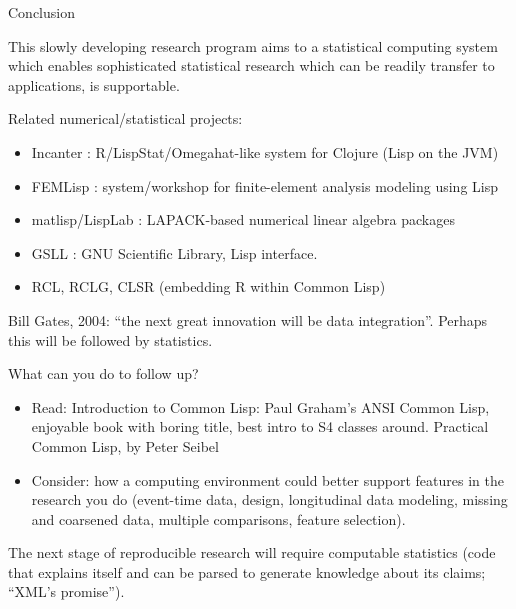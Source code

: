 \documentclass{beamer}
\begin{document}
\begin{frame}{Conclusion}

  This slowly developing research program aims to a statistical
  computing system which enables sophisticated statistical research
  which can be readily transfer to applications, is supportable.

  Related numerical/statistical projects:
  \begin{itemize}
  \item Incanter : R/LispStat/Omegahat-like system for Clojure (Lisp
    on the JVM)
  \item FEMLisp : system/workshop for finite-element analysis modeling
    using Lisp
  \item matlisp/LispLab : LAPACK-based numerical linear algebra packages
  \item GSLL : GNU Scientific Library, Lisp interface.
  \item RCL, RCLG, CLSR (embedding R within Common Lisp)
  \end{itemize}

  Bill Gates, 2004: ``the next great innovation will be data
  integration''.  Perhaps this will be followed by statistics.
\end{frame}

\begin{frame}{What can you do to follow up?}

  \begin{itemize}
  \item Read:  Introduction to Common Lisp: Paul Graham's ANSI Common Lisp,
    enjoyable book with boring title, best intro to S4 classes
    around.  Practical Common Lisp, by Peter Seibel
  \item Consider:  how a computing environment could better support
    features in the research you do (event-time data, design,
    longitudinal data modeling, missing and coarsened data, multiple
    comparisons, feature selection). 
  \end{itemize}
  The next stage of reproducible research will require computable
  statistics (code that explains itself and can be parsed to generate
  knowledge about its claims; ``XML's promise'').
\end{frame}
\end{document}
